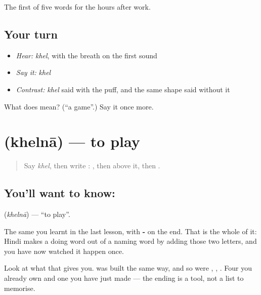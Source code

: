 \begin{grammarlens}[title={What you've built}]
The first of five words for the hours after work.
\end{grammarlens}

\subsection*{Your turn}
\begin{itemize}
\raggedright
  \item \emph{Hear:} \emph{khel}, with the breath on the first sound
  \item \emph{Say it:} \emph{khel}
  \item \emph{Contrast:} \emph{khel} said with the puff, and the same shape said without it
\end{itemize}

\begin{tcolorbox}[breakable,colback=teal!4,colframe=teal!35!black,title={Before you move on}]
What does  mean? (\textquotedblleft{}a game\textquotedblright{}.) Say it once more.
\end{tcolorbox}
\section[khelnā]{ (khelnā) — to play}

\label{lesson:HI-C70-play}



\begin{quote}
Say \emph{khel}, then write \textbf{}: , then  above it, then .
\end{quote}

\subsection*{You'll want to know: }
\textbf{} (\emph{khelnā}) — \textquotedblleft{}to play\textquotedblright{}.

The same  you learnt in the last lesson, with \textbf{-} on the end. That is the whole of it: Hindi makes a doing word out of a naming word by adding those two letters, and you have now watched it happen once.

Look at what that gives you. \textbf{} was built the same way, and so were \textbf{}, \textbf{}, \textbf{}. Four you already own and one you have just made — the ending is a tool, not a list to memorise.

